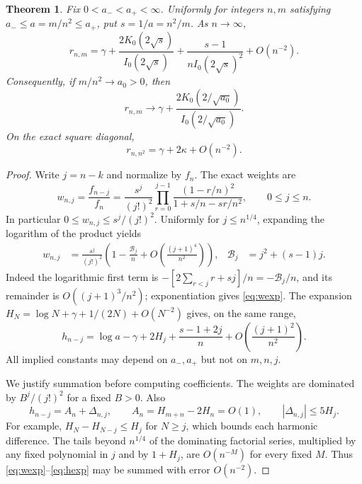 \documentclass[11pt]{article}
\newtheorem{theorem}{Theorem}[section]
\theoremstyle{definition}
\theoremstyle{remark}
\begin{document}
\begin{theorem}\label{thm:limit}
Fix $0<a_-<a_+<\infty$. Uniformly for integers $n,m$ satisfying
$a_-\le a=m/n^2\le a_+$, put $s=1/a=n^2/m$. As $n\to\infty$,
\begin{equation}\label{eq:expansion}
r_{n,m}=\gamma+\frac{2K_0(2\sqrt s)}{I_0(2\sqrt s)}
       +\frac{s-1}{n I_0(2\sqrt s)^2}+O(n^{-2}).
\end{equation}
Consequently, if $m/n^2\to a_0>0$, then
\[
r_{n,m}\longrightarrow
\gamma+\frac{2K_0(2/\sqrt{a_0})}{I_0(2/\sqrt{a_0})}.
\]
On the exact square diagonal,
\begin{equation}\label{eq:square}
r_{n,n^2}=\gamma+2\kappa+O(n^{-2}).
\end{equation}
\end{theorem}
\begin{proof}
Write $j=n-k$ and normalize by $f_n$. The exact weights are
\begin{equation}\label{eq:weights}
w_{n,j}=\frac{f_{n-j}}{f_n}
 =\frac{s^j}{(j!)^2}\prod_{r=0}^{j-1}
       \frac{(1-r/n)^2}{1+s/n-sr/n^2},\qquad 0\le j\le n.
\end{equation}
In particular $0\le w_{n,j}\le s^j/(j!)^2$. Uniformly for
$j\le n^{1/4}$, expanding the logarithm of the product yields
\begin{align}
w_{n,j}&=\frac{s^j}{(j!)^2}
\left(1-\frac{\mathcal B_j}{n}
       +O\left(\frac{(j+1)^4}{n^2}\right)\right),
& \mathcal B_j&=j^2+(s-1)j.\label{eq:wexp}
\end{align}
Indeed the logarithmic first term is
$-[2\sum_{r<j}r+sj]/n=-\mathcal B_j/n$, and its remainder is
$O((j+1)^3/n^2)$; exponentiation gives \eqref{eq:wexp}.
The expansion $H_N=\log N+\gamma+1/(2N)+O(N^{-2})$ gives, on the same range,
\begin{equation}\label{eq:hexp}
h_{n-j}=\log a-\gamma+2H_j
       +\frac{s-1+2j}{n}
       +O\left(\frac{(j+1)^2}{n^2}\right).
\end{equation}
All implied constants may depend on $a_-,a_+$ but not on $m,n,j$.

We justify summation before computing coefficients. The weights are
dominated by $B^j/(j!)^2$ for a fixed $B>0$. Also
\[
h_{n-j}=A_n+\Delta_{n,j},\qquad
A_n=H_{m+n}-2H_n=O(1),\qquad
|\Delta_{n,j}|\le5H_j.
\]
For example, $H_N-H_{N-j}\le H_j$ for $N\ge j$, which bounds each
harmonic difference. The tails beyond $n^{1/4}$ of the dominating
factorial series, multiplied by any fixed polynomial in $j$ and by
$1+H_j$, are $O(n^{-M})$ for every fixed $M$. Thus
\eqref{eq:wexp}--\eqref{eq:hexp} may be summed with error $O(n^{-2})$.


\end{proof}
\end{document}
